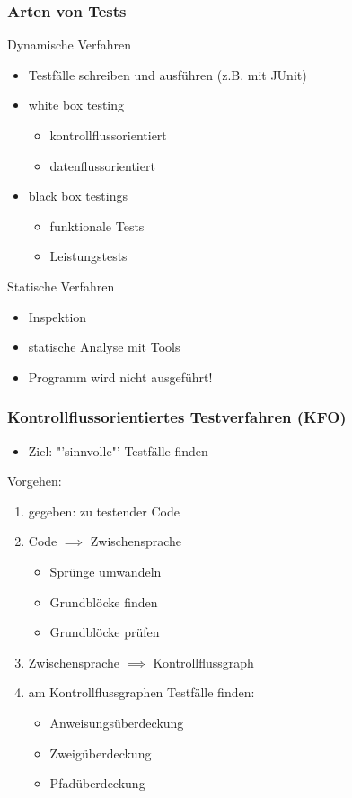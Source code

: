\documentclass[18pt]{beamer}
\begin{document}
	\begin{frame}
		\frametitle{Arten von Tests}
		\begin{block}{Dynamische Verfahren}
			\begin{itemize}
				\item Testfälle schreiben und ausführen (z.B. mit JUnit) \pause
				\item white box testing \pause
				\begin{itemize}
					\item kontrollflussorientiert
					\item datenflussorientiert
				\end{itemize}
				\item black box testings \pause
				\begin{itemize}
					\item funktionale Tests \pause
					\item Leistungstests
				\end{itemize}
			\end{itemize}
		\end{block}
		\pause
		\begin{block}{Statische Verfahren}
			\begin{itemize}
				\item Inspektion \pause
				\item statische Analyse mit Tools \pause
				\item Programm wird nicht ausgeführt!
			\end{itemize}
		\end{block}
	\end{frame}

	\begin{frame}
		\frametitle{Kontrollflussorientiertes Testverfahren (KFO)}
		\begin{itemize}
			\item Ziel: "'sinnvolle"' Testfälle finden
		\end{itemize}
		Vorgehen:
		\begin{enumerate}
			\item gegeben: zu testender Code \pause
			\item Code $\implies$ Zwischensprache
			\begin{itemize}
				\item Sprünge umwandeln
				\item Grundblöcke finden
				\item Grundblöcke prüfen
			\end{itemize}
			\pause
			\item Zwischensprache $\implies$ Kontrollflussgraph \pause
			\item am Kontrollflussgraphen Testfälle finden: \pause
			\begin{itemize}
				\item Anweisungsüberdeckung
				\item Zweigüberdeckung 
				\item Pfadüberdeckung
			\end{itemize}
		\end{enumerate}
	\end{frame}
\end{document}
